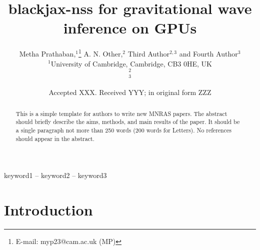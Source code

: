 \documentclass[fleqn,usenatbib]{mnras}
\title[Short title, max. 45 characters]{blackjax-nss for gravitational wave inference on GPUs}
\author[Metha Prathaban et al.]{
Metha Prathaban,$^{1}$\thanks{E-mail: myp23@cam.ac.uk (MP)}
A. N. Other,$^{2}$
Third Author$^{2,3}$
and Fourth Author$^{3}$
\\
$^{1}$University of Cambridge, Cambridge, CB3 0HE, UK\\
$^{2}$\\
$^{3}$
}
\date{Accepted XXX. Received YYY; in original form ZZZ}
\begin{document}
\label{firstpage}
\pagerange{\pageref{firstpage}--\pageref{lastpage}}
\maketitle

\begin{abstract}
This is a simple template for authors to write new MNRAS papers.
The abstract should briefly describe the aims, methods, and main results of the paper.
It should be a single paragraph not more than 250 words (200 words for Letters).
No references should appear in the abstract.
\end{abstract}

\begin{keywords}
keyword1 -- keyword2 -- keyword3
\end{keywords}



\section{Introduction}






\end{document}
